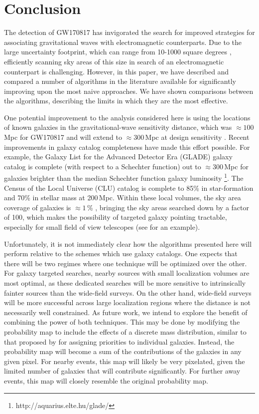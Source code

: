 \documentclass[twocolumn]{aastex62}
\begin{document}
\section{Conclusion}
\label{sec:conclusions}

The detection of GW170817 \citep{AbEA2017b} has invigorated the search for improved strategies for associating gravitational waves with electromagnetic
counterparts.
Due to the large uncertainty footprint, which can range from 10-1000 square degrees \citep{AbEA2016h}, efficiently scanning sky areas  of this size in search of an electromagnetic counterpart is challenging.
However, in this paper, we have described and compared a number of algorithms in the literature available for significantly improving upon the most naive approaches.
We have shown comparisons between the algorithms, describing the limits in which they are the most effective.

One potential improvement to the analysis considered here is using the locations of known galaxies in the gravitational-wave sensitivity distance, which was $\approx 100$\,Mpc for GW170817 \citep{AbEA2017b} and will extend to $\approx 300$\,Mpc at design sensitivity \citep{AbEA2016h}. 
Recent improvements in galaxy catalog completeness have made this effort possible. For example, the Galaxy List for the Advanced Detector Era (GLADE) galaxy catalog is complete (with respect to a Schechter function) out to $\approx 300$\,Mpc for galaxies brighter than the median Schechter function galaxy luminosity \footnote{http://aquarius.elte.hu/glade/}. The Census of the Local Universe (CLU) catalog \citep{CoKa2017} is complete to 85\% in star-formation and 70\% in stellar mass at 200\,Mpc.
Within these local volumes, the sky area coverage of galaxies is $\approx 1$\,\% \cite{CoKa2017}, bringing the sky areas searched down by a factor of 100, which makes the possibility of targeted galaxy pointing tractable, especially for small field of view telescopes (see \cite{ArMc2017} for an example). 

Unfortunately, it is not immediately clear how the algorithms presented here will perform relative to the schemes which use galaxy catalogs.
One expects that there will be two regimes where one technique will be optimized over the other.
For galaxy targeted searches, nearby sources with small localization volumes are most optimal, as these dedicated searches will be more sensitive to intrinsically fainter sources than the wide-field surveys.
On the other hand, wide-field surveys will be more successful across large localization regions where the distance is not necessarily well constrained.
As future work, we intend to explore the benefit of combining the power of both techniques. This may be done by modifying the probability map to include the effects of a discrete mass distribution, similar to that proposed by \cite{ArMc2017} for assigning priorities to individual galaxies. Instead, the probability map will become a sum of the contributions of the galaxies in any given pixel. For nearby events, this map will likely be very pixelated, given the limited number of galaxies that will contribute significantly. For further away events, this map will closely resemble the original probability map.
\end{document}
